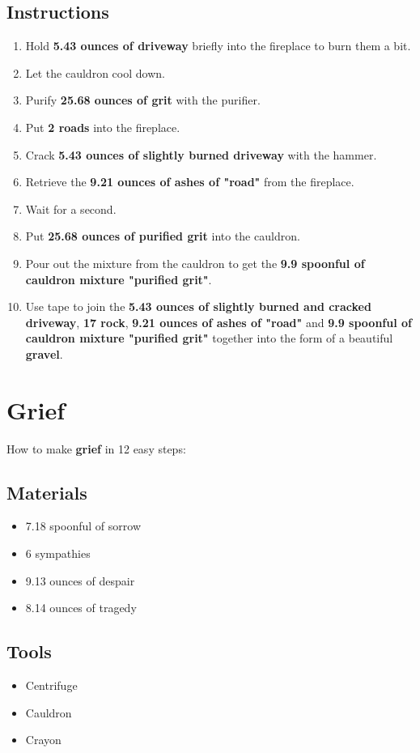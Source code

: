 \documentclass{article}
\begin{document}
\subsection{Instructions}\begin{enumerate}
\item 
Hold \textbf{5.43 ounces of driveway} briefly into the fireplace to burn them a bit.
\item 
Let the cauldron cool down.
\item 
Purify \textbf{25.68 ounces of grit} with the purifier.
\item 
Put \textbf{2 roads} into the fireplace.
\item 
Crack \textbf{5.43 ounces of slightly burned driveway} with the hammer.
\item 
Retrieve the \textbf{9.21 ounces of ashes of "road"} from the fireplace.
\item 
Wait for a second.
\item 
Put \textbf{25.68 ounces of purified grit} into the cauldron.
\item 
Pour out the mixture from the cauldron to get the \textbf{9.9 spoonful of cauldron mixture "purified grit"}.
\item 
Use tape to join the \textbf{5.43 ounces of slightly burned and cracked driveway}, \textbf{17 rock}, \textbf{9.21 ounces of ashes of "road"} and \textbf{9.9 spoonful of cauldron mixture "purified grit"} together into the form of a beautiful \textbf{gravel}.
\end{enumerate}
\newpage
\section{Grief}How to make \textbf{grief} in 12 easy steps:

\subsection{Materials}\begin{itemize}
\item 
7.18 spoonful of sorrow
\item 
6 sympathies
\item 
9.13 ounces of despair
\item 
8.14 ounces of tragedy
\end{itemize}
\subsection{Tools}\begin{itemize}
\item 
Centrifuge
\item 
Cauldron
\item 
Crayon
\end{itemize}
\end{document}
